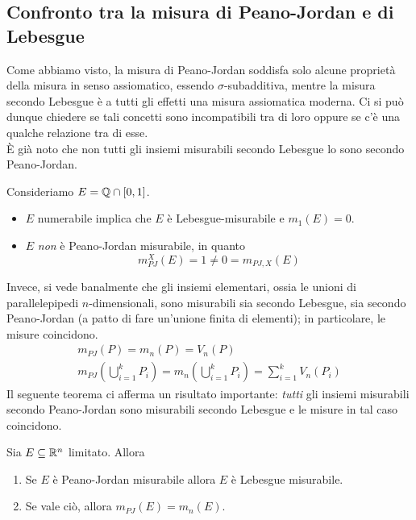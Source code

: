 \subsection{Confronto tra la misura di Peano-Jordan e di Lebesgue}
Come abbiamo visto, la misura di Peano-Jordan soddisfa solo alcune proprietà della misura in senso assiomatico, essendo $\sigma$-subadditiva, mentre la misura secondo Lebesgue è a tutti gli effetti una misura assiomatica moderna. Ci si può dunque chiedere se tali concetti sono incompatibili tra di loro oppure se c'è una qualche relazione tra di esse.\\
È già noto che non tutti gli insiemi misurabili secondo Lebesgue lo sono secondo Peano-Jordan.
\begin{example}
	Consideriamo $E=\mathbb{Q}\cap\left[0,1\right]$.
	\begin{itemize}
		\item $E$ numerabile implica che $E$ è Lebesgue-misurabile e $m_1\left(E\right)=0$.
		\item $E$ \textit{non} è Peano-Jordan misurabile, in quanto
		\begin{equation*}
			m_{PJ}^{X}\left(E\right)=1\neq 0=m_{PJ,X}\left(E\right)
		\end{equation*}
	\end{itemize}
\end{example}
Invece, si vede banalmente che gli insiemi elementari, ossia le unioni di parallelepipedi $n$-dimensionali, sono misurabili sia secondo Lebesgue, sia secondo Peano-Jordan (a patto di fare un'unione finita di elementi); in particolare, le misure coincidono.
\begin{gather*}
	m_{PJ}\left(P\right)=m_n\left(P\right)=V_n\left(P\right)\\
	m_{PJ}\left(\bigcup_{i=1}^{k}P_i\right)=m_n\left(\bigcup_{i=1}^{k}P_i\right)=\sum_{i=1}^{k}V_n\left(P_i\right)
\end{gather*}
Il seguente teorema ci afferma un risultato importante: \textit{tutti} gli insiemi misurabili secondo Peano-Jordan sono misurabili secondo Lebesgue e le misure in tal caso coincidono.
\begin{theorema}
	Sia $E\subseteq\mathbb{R}^n$ limitato. Allora
	\begin{enumerate}
		\item Se $E$ è Peano-Jordan misurabile allora $E$ è Lebesgue misurabile.
		\item Se vale ciò, allora $m_{PJ}\left(E\right)=m_n\left(E\right)$.
	\end{enumerate}
\end{theorema}
